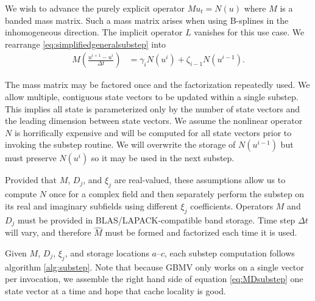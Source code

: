 \documentclass[letterpaper,reqno,11pt]{amsart}
\begin{document}
We wish to advance the purely explicit operator $M u_t = N\left( u \right)$
where $M$ is a banded mass matrix.  Such a mass matrix arises when using
B-splines in the inhomogeneous direction.  The implicit operator $L$ vanishes
for this use case.  We rearrange \eqref{eq:simplifiedgeneralsubstep} into
\begin{align}
  M
  \left(\frac{u^{i+1} - u^{i}}{\Delta{}t}\right)
  &=
    \gamma_{i}  N\left( u^{i} \right)
  + \zeta_{i-1} N\left( u^{i-1} \right)
  .
\end{align}

The mass matrix may be factored once and the factorization repeatedly used.  We
allow multiple, contiguous state vectors to be updated within a single substep.
This implies all state is parameterized only by the number of state vectors and
the leading dimension between state vectors.  We assume the nonlinear operator
$N$ is horrifically expensive and will be computed for all state vectors prior
to invoking the substep routine.  We will overwrite the storage of $N\left(
u^{i-1} \right)$ but must preserve $N\left( u^i \right)$ so it may be used in
the next substep.




Provided that $M$, $D_j$, and $\xi_j$ are real-valued, these assumptions allow
us to compute $N$ once for a complex field and then separately perform the
substep on its real and imaginary subfields using different $\xi_j$
coefficients.  Operators $M$ and $D_j$ must be provided in
BLAS/LAPACK-compatible band storage.  Time step $\Delta{}t$ will vary, and
therefore $\hat{M}$ must be formed and factorized each time it is used.

Given $M$, $D_j$, $\xi_j$, and storage locations $a$--$c$, each
substep computation follows algorithm \ref{alg:substep}.  Note that because
GBMV only works on a single vector per invocation, we assemble the right hand
side of equation \eqref{eq:MDsubstep} one state vector at a time and hope that
cache locality is good.
\end{document}
